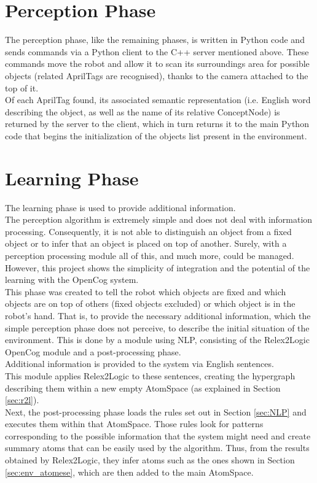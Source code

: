 \section{Perception Phase}\label{sec:perception}

The perception phase, like the remaining phases, is written in Python code and sends commands via a Python client to the C++ server mentioned above. These commands move the robot and allow it to scan its surroundings area for possible objects (related AprilTags are recognised), thanks to the camera attached to the top of it. \\
Of each AprilTag found, its associated semantic representation (i.e. English word describing the object, as well as the name of its relative ConceptNode) is returned by the server to the client, which in turn returns it to the main Python code that begins the initialization of the objects list present in the environment.

\section{Learning Phase}\label{sec:learning}

The learning phase is used to provide additional information. \\
The perception algorithm is extremely simple and does not deal with information processing. Consequently, it is not able to distinguish an object from a fixed object or to infer that an object is placed on top of another. Surely, with a perception processing module all of this, and much more, could be managed. \\
However, this project shows the simplicity of integration and the potential of the learning with the OpenCog system. \\

This phase was created to tell the robot which objects are fixed and which objects are on top of others (fixed objects excluded) or which object is in the robot's hand. That is, to provide the necessary additional information, which the simple perception phase does not perceive, to describe the initial situation of the environment.
This is done by a module using NLP, consisting of the Relex2Logic OpenCog module and a post-processing phase. \\

Additional information is provided to the system via English sentences. \\
This module applies Relex2Logic to these sentences, creating the hypergraph describing them within a new empty AtomSpace (as explained in Section \ref{sec:r2l}).  \\
Next, the post-processing phase loads the rules set out in Section \ref{sec:NLP} and executes them within that AtomSpace. Those rules look for patterns corresponding to the possible information that the system might need and create summary atoms that can be easily used by the algorithm. Thus, from the results obtained by Relex2Logic, they infer atoms such as the ones shown in Section \ref{sec:env_atomese}, which are then added to the main AtomSpace. \\


